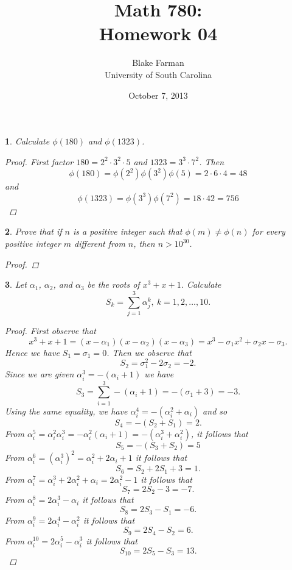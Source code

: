 \documentclass[10pt]{amsart}
\author{Blake Farman\\University of South Carolina}
\title{Math 780:\\Homework 04}
\date{October 7, 2013}
\begin{document}
\maketitle

\providecommand{\p}{\mathfrak{p}}
\providecommand{\m}{\mathfrak{m}}

\newtheorem{thm}{}
\newtheorem{lem}{Lemma}

\begin{thm}\label{ex1}
  Calculate $\phi(180)$ and $\phi(1323)$.
  
  \begin{proof}
    First factor $180 = 2^2 \cdot 3^2 \cdot 5$ and $1323 = 3^3 \cdot 7^2$.
    Then 
    $$\phi(180) = \phi(2^2)\phi(3^2)\phi(5) = 2 \cdot 6 \cdot 4 = 48$$
    and
    $$\phi(1323) = \phi(3^3)\phi(7^2) = 18 \cdot 42 = 756$$
  \end{proof}
\end{thm}

\begin{thm}\label{ex1}
  Prove that if $n$ is a positive integer such that $\phi(m) \neq \phi(n)$ for every positive integer $m$ different from $n$, then $n > 10^{30}$.
   
  \begin{proof}
  \end{proof}
\end{thm}

\begin{thm}\label{ex1}
  Let $\alpha_1$, $\alpha_2$, and $\alpha_3$ be the roots of $x^3 + x + 1$.
  Calculate 
  $$S_k = \sum_{j=1}^3 \alpha_j^k,\ k = 1, 2, \ldots, 10.$$
  
  \begin{proof}
    First observe that 
    $$x^3 + x + 1 = (x - \alpha_1)(x - \alpha_2)(x - \alpha_3) = x^3 - \sigma_1 x^2 + \sigma_2 x - \sigma_3.$$
    Hence we have $S_1 = \sigma_1 = 0$.
    Then we observe that
    $$S_2 = \sigma_1^2 - 2\sigma_2 = -2.$$
    Since we are given $\alpha_i^3 = -(\alpha_i + 1)$ we have
    $$S_3 = \sum_{i=1}^3 -(\alpha_i + 1) = -(\sigma_1 + 3) = -3.$$
    Using the same equality, we have $\alpha_i^4 = -(\alpha_i^2 + \alpha_i)$ and so
    $$S_4 = -(S_2 + S_1) = 2.$$
    From $\alpha_i^5 = \alpha_i^2\alpha_i^3 = -\alpha_i^2(\alpha_i + 1) = -(\alpha_i^3 + \alpha_i^2)$, it follows that
    $$S_5 = -(S_3 + S_2) = 5$$
    From $\alpha_i^6 = (\alpha_i^3)^2 = \alpha_i^2 + 2\alpha_i + 1$ it follows that
    $$S_6 = S_2 + 2S_1 + 3 = 1.$$
    From $\alpha_i^7 = \alpha_i^3 + 2\alpha_i^2 + \alpha_i = 2\alpha_i^2 - 1$ it follows that
    $$S_7 = 2S_2 - 3 = -7.$$
    From $\alpha_i^8 = 2\alpha_i^3 - \alpha_i$ it follows that
    $$S_8 = 2S_3 - S_1 = -6.$$
    From $\alpha_i^9 = 2\alpha_i^4 - \alpha_i^2$ it follows that
    $$S_9 = 2S_4 - S_2 = 6.$$
    From $\alpha_i^{10} = 2\alpha_i^5 - \alpha_i^3$ it follows that
    $$S_{10} = 2S_5 - S_3 = 13.$$
  \end{proof}
\end{thm}
\end{document}
